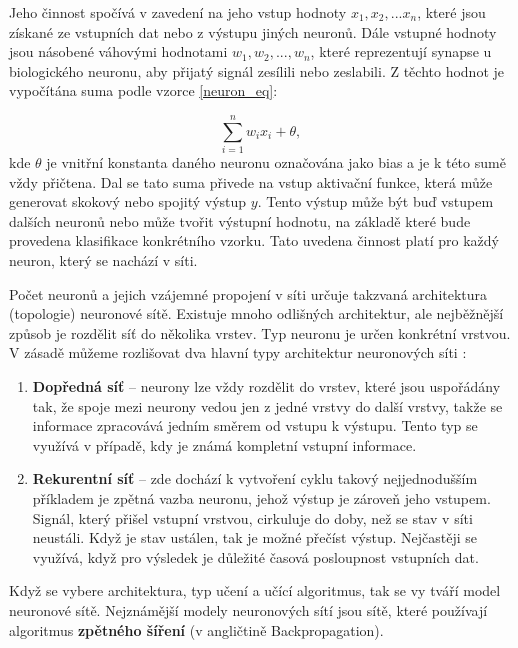 Jeho činnost spočívá v zavedení na jeho vstup hodnoty $x_1,x_2,...x_n$, které jsou získané ze vstupních dat nebo z výstupu jiných neuronů. Dále vstupné hodnoty jsou násobené váhovými hodnotami $w_1,w_2,...,w_n$, které reprezentují synapse u biologického neuronu, aby přijatý signál zesílili nebo zeslabili. Z těchto hodnot je vypočítána suma podle vzorce \ref{neuron_eq}:

    \begin{equation}
	    \sum_{i=1}^n w_ix_i + \theta,
	    \label{neuron_eq}
    \end{equation}
kde $\theta$ je vnitřní konstanta daného neuronu označována jako bias a je k této sumě vždy přičtena. Dal se tato suma přivede  na vstup aktivační funkce, která může generovat skokový nebo spojitý výstup $y$. Tento výstup může být buď vstupem dalších neuronů nebo může tvořit výstupní hodnotu, na základě které bude provedena klasifikace konkrétního vzorku. Tato uvedena činnost platí pro každý neuron, který se nachází v síti. \cite{Han}

Počet neuronů a jejich vzájemné propojení v síti určuje takzvaná architektura (topologie) neuronové sítě. Existuje mnoho odlišných architektur, ale nejběžnější způsob je rozdělit síť do několika vrstev. Typ neuronu je určen konkrétní vrstvou. V zásadě můžeme rozlišovat dva hlavní typy architektur neuronových síti \cite{Dunham}:

\begin{enumerate}
    \item \textbf{Dopředná síť} -- neurony lze vždy rozdělit do vrstev, které jsou uspořádány tak, že spoje mezi neurony vedou jen z jedné vrstvy do další vrstvy, takže se informace zpracovává jedním směrem od vstupu k výstupu. Tento typ se využívá v případě, kdy je známá kompletní vstupní informace.
    \item \textbf{Rekurentní síť } -- zde dochází k vytvoření cyklu takový nejjednodušším příkladem je zpětná vazba neuronu, jehož výstup je zároveň jeho vstupem. Signál, který přišel vstupní vrstvou, cirkuluje do doby, než se stav v síti neustáli. Když je stav ustálen, tak je možné přečíst výstup. Nejčastěji se využívá, když pro výsledek je důležité časová posloupnost vstupních dat.
\end{enumerate}

Když se vybere architektura, typ učení a učící algoritmus, tak se vy tváří model neuronové sítě. Nejznámější modely neuronových sítí jsou sítě, které používají algoritmus \textbf{zpětného šíření} (v angličtině Backpropagation). 

